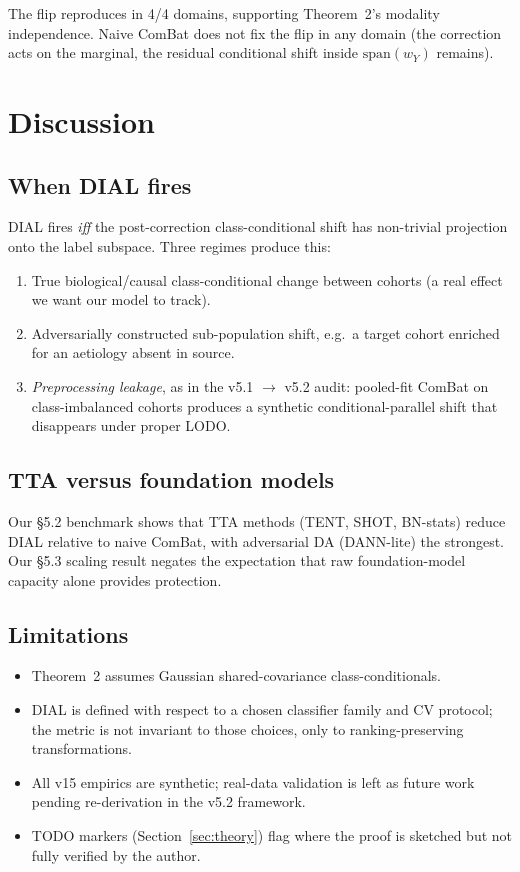 \documentclass{article}
\begin{document}
The flip reproduces in 4/4 domains, supporting Theorem~2's modality
independence. Naive ComBat does not fix the flip in any domain (the
correction acts on the marginal, the residual conditional shift inside
$\mathrm{span}(w_Y)$ remains).

\section{Discussion}

\subsection{When DIAL fires}
DIAL fires \emph{iff} the post-correction class-conditional shift has
non-trivial projection onto the label subspace. Three regimes produce
this:
\begin{enumerate}
\item True biological/causal class-conditional change between cohorts
  (a real effect we want our model to track).
\item Adversarially constructed sub-population shift, e.g.\ a target
  cohort enriched for an aetiology absent in source.
\item \emph{Preprocessing leakage}, as in the v5.1 $\to$ v5.2 audit:
  pooled-fit ComBat on class-imbalanced cohorts produces a synthetic
  conditional-parallel shift that disappears under proper LODO.
\end{enumerate}

\subsection{TTA versus foundation models}
Our §5.2 benchmark shows that TTA methods (TENT, SHOT, BN-stats) reduce
DIAL relative to naive ComBat, with adversarial DA (DANN-lite) the
strongest. Our §5.3 scaling result negates the expectation that raw
foundation-model capacity alone provides protection.

\subsection{Limitations}
\begin{itemize}
\item Theorem~2 assumes Gaussian shared-covariance class-conditionals.
\item DIAL is defined with respect to a chosen classifier family and CV
  protocol; the metric is not invariant to those choices, only to
  ranking-preserving transformations.
\item All v15 empirics are synthetic; real-data validation is left as
  future work pending re-derivation in the v5.2 framework.
\item TODO markers (Section~\ref{sec:theory}) flag where the proof is
  sketched but not fully verified by the author.
\end{itemize}
\end{document}
